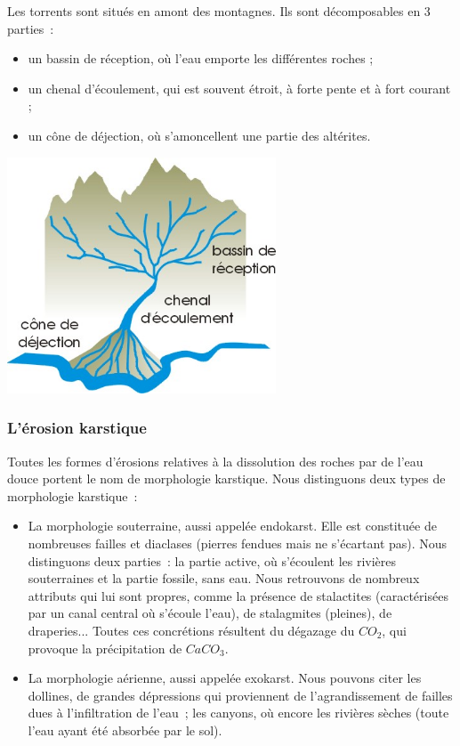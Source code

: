\documentclass[a4paper,11pt]{article}
\begin{document}
Les torrents sont situés en amont des montagnes.
Ils sont décomposables en 3 parties~:
\begin{itemize}
  \item un bassin de réception, où l'eau emporte les différentes roches ;
  \item un chenal d'écoulement, qui est souvent étroit, à forte pente et à fort courant ;
  \item un cône de déjection, où s'amoncellent une partie des altérites.
\end{itemize}

\begin{center}
  \includegraphics[width=8cm]{Images/Erosion/torrent2.jpg}
\end{center}

\subsubsection{L'érosion karstique}

Toutes les formes d'érosions relatives à la dissolution des roches par de l'eau douce portent le nom de morphologie karstique.
Nous distinguons deux types de morphologie karstique~:
\begin{itemize}
  \item La morphologie souterraine, aussi appelée endokarst.
  Elle est constituée de nombreuses failles et diaclases (pierres fendues mais ne s'écartant pas).
  Nous distinguons deux parties~: la partie active, où s'écoulent les rivières souterraines et la partie fossile, sans eau.
  Nous retrouvons de nombreux attributs qui lui sont propres, comme la présence de stalactites (caractérisées par un canal central où s'écoule l'eau), de stalagmites (pleines), de draperies...
  Toutes ces concrétions résultent du dégazage du $CO_2$, qui provoque la précipitation de $CaCO_3$.

  \item La morphologie aérienne, aussi appelée exokarst.
  Nous pouvons citer les dollines, de grandes dépressions qui proviennent de l'agrandissement de failles dues à l'infiltration de l'eau~; les canyons, où encore les rivières sèches (toute l'eau ayant été absorbée par le sol).
\end{itemize}
\end{document}
